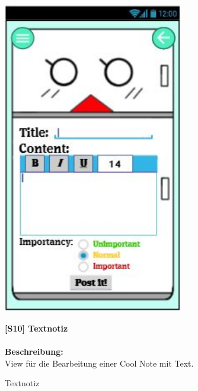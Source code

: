 \documentclass[a4paper]{scrreprt}
\begin{document}
    	\begin{figure}[h!]
    		\begin{minipage}[t]{0.4\linewidth}
    			\flushright
    			\centering
    			\vspace{9mm}
    			\includegraphics[width=0.7\textwidth]{fridget_textnote.JPG}
    			\caption{Textnotiz}
    			\label{fig:figure1}
    		\end{minipage}
    		\hspace{0.5cm}
    		\begin{minipage}[t]{0.55\linewidth}
    			\flushleft
    			\vspace{9mm}
    			\textbf{{[}S10{]} Textnotiz} \\
    			\hfill
    			\\
    			\textbf{Beschreibung:} \\
    			View für die Bearbeitung einer Cool Note mit
    			Text.
    			 

\end{minipage}
\end{figure}
\end{document}
